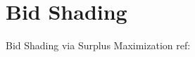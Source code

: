 \documentclass[../main.tex]{subfiles}
\begin{document}
	\chapter{Bid Shading}
	
	
\begin{section} {Bid Shading via Surplus Maximization}
	ref: \cite{pan2020bid}
\end{section}
	
\end{document}
